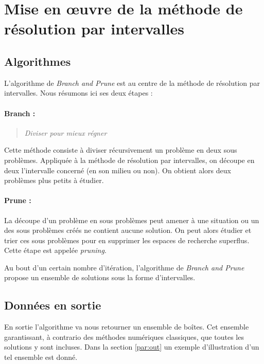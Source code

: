 \section{Mise en œuvre de la méthode de résolution par intervalles}



\subsection{Algorithmes}
L'algorithme de \emph{Branch and Prune} est au centre de la méthode de résolution par intervalles. Nous résumons ici ses deux étapes :  %
\paragraph{Branch :}
\begin{quote}\emph{Diviser pour mieux régner}\end{quote} Cette méthode consiste à diviser récursivement un problème en deux sous problèmes. Appliquée à la méthode de résolution par intervalles, on découpe en deux l'intervalle concerné (en son milieu ou non). On obtient alors deux problèmes plus \og petits \fg{} à étudier.%

\paragraph{Prune :}
La découpe d'un problème en sous problèmes peut amener à une situation ou un des sous problèmes créés ne contient aucune solution. On peut alors étudier et trier ces sous problèmes pour en supprimer les espaces de recherche superflus. Cette étape est appelée \emph{pruning}.

Au bout d'un certain nombre d'itération, l'algorithme de \emph{Branch and Prune} propose un ensemble de solutions sous la forme d'intervalles.%





\subsection{Données en sortie}
En sortie l'algorithme va nous retourner un ensemble de boîtes. Cet ensemble garantissant, à contrario des méthodes numériques classiques, que toutes les solutions y sont incluses. Dans la section \ref{par:out} un exemple d'illustration d'un tel ensemble est donné.

